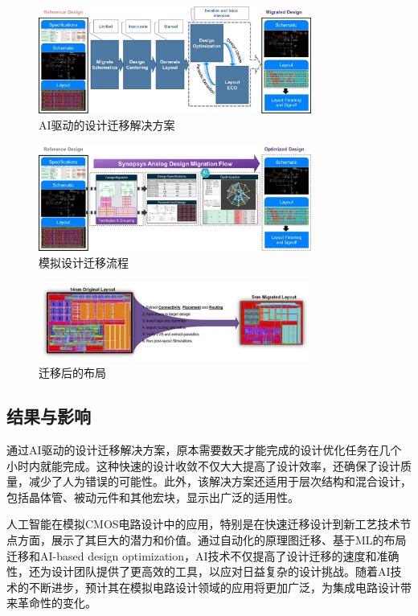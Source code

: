 \begin{figure}[htbp]
    \centering
    \includegraphics[width=0.8\textwidth]{images/figure-2-3-layout-migration.jpeg}
    \caption{AI驱动的设计迁移解决方案}
    \label{fig:ai-design-migration}
\end{figure}

\begin{figure}[htbp]
    \centering
    \includegraphics[width=0.8\textwidth]{images/figure-2-3-analog-design-migration-flow.jpg}
    \caption{模拟设计迁移流程}
    \label{fig:analog-design-migration-flow}
\end{figure}

\begin{figure}[htbp]
    \centering
    \includegraphics[width=0.8\textwidth]{images/figure-2-3-analog-migrated-layout-cd-blog.jpeg}
    \caption{迁移后的布局}
    \label{fig:analog-migrated-layout-cd-blog}
\end{figure}

\subsection{结果与影响}

通过AI驱动的设计迁移解决方案，原本需要数天才能完成的设计优化任务在几个小时内就能完成。这种快速的设计收敛不仅大大提高了设计效率，还确保了设计质量，减少了人为错误的可能性。此外，该解决方案还适用于层次结构和混合设计，包括晶体管、被动元件和其他宏块，显示出广泛的适用性。

人工智能在模拟CMOS电路设计中的应用，特别是在快速迁移设计到新工艺技术节点方面，展示了其巨大的潜力和价值。通过自动化的原理图迁移、基于ML的布局迁移和AI-based design optimization，AI技术不仅提高了设计迁移的速度和准确性，还为设计团队提供了更高效的工具，以应对日益复杂的设计挑战。随着AI技术的不断进步，预计其在模拟电路设计领域的应用将更加广泛，为集成电路设计带来革命性的变化。
